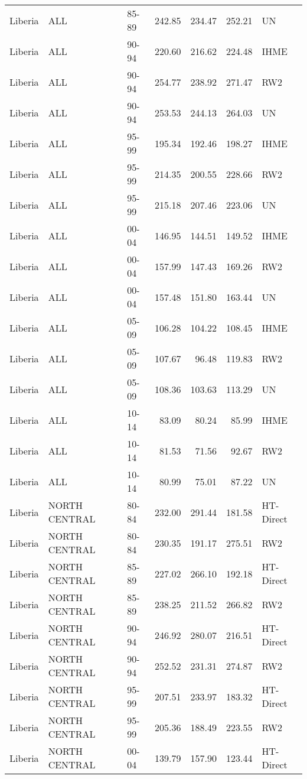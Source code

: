 \begin{longtable}{lllrrrl}
  Liberia & ALL & 85-89 & 242.85 & 234.47 & 252.21 & UN \\ 
  Liberia & ALL & 90-94 & 220.60 & 216.62 & 224.48 & IHME \\ 
  Liberia & ALL & 90-94 & 254.77 & 238.92 & 271.47 & RW2 \\ 
  Liberia & ALL & 90-94 & 253.53 & 244.13 & 264.03 & UN \\ 
  Liberia & ALL & 95-99 & 195.34 & 192.46 & 198.27 & IHME \\ 
  Liberia & ALL & 95-99 & 214.35 & 200.55 & 228.66 & RW2 \\ 
  Liberia & ALL & 95-99 & 215.18 & 207.46 & 223.06 & UN \\ 
  Liberia & ALL & 00-04 & 146.95 & 144.51 & 149.52 & IHME \\ 
  Liberia & ALL & 00-04 & 157.99 & 147.43 & 169.26 & RW2 \\ 
  Liberia & ALL & 00-04 & 157.48 & 151.80 & 163.44 & UN \\ 
  Liberia & ALL & 05-09 & 106.28 & 104.22 & 108.45 & IHME \\ 
  Liberia & ALL & 05-09 & 107.67 & 96.48 & 119.83 & RW2 \\ 
  Liberia & ALL & 05-09 & 108.36 & 103.63 & 113.29 & UN \\ 
  Liberia & ALL & 10-14 & 83.09 & 80.24 & 85.99 & IHME \\ 
  Liberia & ALL & 10-14 & 81.53 & 71.56 & 92.67 & RW2 \\ 
  Liberia & ALL & 10-14 & 80.99 & 75.01 & 87.22 & UN \\ 
  Liberia & NORTH CENTRAL & 80-84 & 232.00 & 291.44 & 181.58 & HT-Direct \\ 
  Liberia & NORTH CENTRAL & 80-84 & 230.35 & 191.17 & 275.51 & RW2 \\ 
  Liberia & NORTH CENTRAL & 85-89 & 227.02 & 266.10 & 192.18 & HT-Direct \\ 
  Liberia & NORTH CENTRAL & 85-89 & 238.25 & 211.52 & 266.82 & RW2 \\ 
  Liberia & NORTH CENTRAL & 90-94 & 246.92 & 280.07 & 216.51 & HT-Direct \\ 
  Liberia & NORTH CENTRAL & 90-94 & 252.52 & 231.31 & 274.87 & RW2 \\ 
  Liberia & NORTH CENTRAL & 95-99 & 207.51 & 233.97 & 183.32 & HT-Direct \\ 
  Liberia & NORTH CENTRAL & 95-99 & 205.36 & 188.49 & 223.55 & RW2 \\ 
  Liberia & NORTH CENTRAL & 00-04 & 139.79 & 157.90 & 123.44 & HT-Direct \\ 

\end{longtable}
